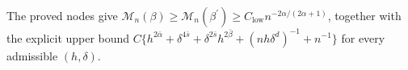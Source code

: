 The proved nodes give \(\mathcal M_n(\beta)\ge\mathcal M_n(\beta^{\prime})\ge C_{\mathrm{low}}n^{-2\alpha/(2\alpha+1)}\), together with the explicit upper bound \(C\{h^{2\bar\alpha}+\delta^{4\bar s}+\delta^{2\bar s}h^{2\bar\beta}+(nh\delta^d)^{-1}+n^{-1}\}\) for every admissible \((h,\delta)\).